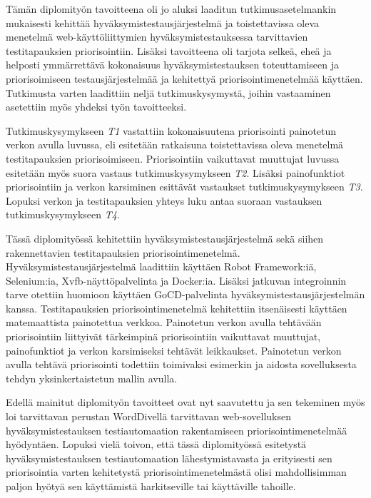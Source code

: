 Tämän diplomityön tavoitteena oli jo aluksi laaditun tutkimusasetelmankin mukaisesti kehittää hyväksymistestausjärjestelmä ja toistettavissa oleva menetelmä web-käyttöliittymien hyväksymistestauksessa tarvittavien testitapauksien priorisointiin.
Lisäksi tavoitteena oli tarjota selkeä, eheä ja helposti ymmärrettävä kokonaisuus hyväksymistestauksen toteuttamiseen ja priorisoimiseen testausjärjestelmää ja kehitettyä priorisointimenetelmää käyttäen.
Tutkimusta varten laadittiin neljä tutkimuskysymystä, joihin vastaaminen asetettiin myös yhdeksi työn tavoitteeksi.

Tutkimuskysymykseen \emph{T1} vastattiin kokonaisuutena priorisointi painotetun verkon avulla luvussa, eli esitetään ratkaisuna toistettavissa oleva menetelmä testitapauksien priorisoimiseen.
Priorisointiin vaikuttavat muuttujat luvussa esitetään myös suora vastaus tutkimuskysymykseen \emph{T2}.
Lisäksi painofunktiot priorisointiin ja verkon karsiminen esittävät vastaukset tutkimuskysymykseen \emph{T3}.
Lopuksi verkon ja testitapauksien yhteys luku antaa suoraan vastauksen tutkimuskysymykseen \emph{T4}.

Tässä diplomityössä kehitettiin hyväksymistestausjärjestelmä sekä siihen rakennettavien testitapauksien priorisointimenetelmä.
Hyväksymistestausjärjestelmä laadittiin käyttäen Robot Framework:iä, Selenium:ia, Xvfb-näyttöpalvelinta ja Docker:ia.
Lisäksi jatkuvan integroinnin tarve otettiin huomioon käyttäen GoCD-palvelinta hyväksymistestausjärjestelmän kanssa.
Testitapauksien priorisointimenetelmä kehitettiin itsenäisesti käyttäen matemaattista painotettua verkkoa.
Painotetun verkon avulla tehtävään priorisointiin liittyivät tärkeimpinä priorisointiin vaikuttavat muuttujat, painofunktiot ja verkon karsimiseksi tehtävät leikkaukset.
Painotetun verkon avulla tehtävä priorisointi todettiin toimivaksi esimerkin ja aidosta sovelluksesta tehdyn yksinkertaistetun mallin avulla.

Edellä mainitut diplomityön tavoitteet ovat nyt saavutettu ja sen tekeminen myös loi tarvittavan perustan WordDivellä tarvittavan web-sovelluksen hyväksymistestauksen testiautomaation rakentamiseen priorisointimenetelmää hyödyntäen.
Lopuksi vielä toivon, että tässä diplomityössä esitetystä hyväksymistestauksen testiautomaation lähestymistavasta ja erityisesti sen priorisointia varten kehitetystä priorisointimenetelmästä olisi mahdollisimman paljon hyötyä sen käyttämistä harkitseville tai käyttäville tahoille.
